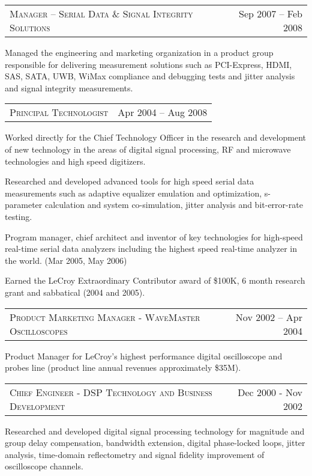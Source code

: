 \documentclass[10pt,letterpaper]{extarticle}
\makeatletter
\newcommand{\headerrow}[2]
{\begin{tabular*}{\linewidth}{l@{\extracolsep{\fill}}r}
	#1 &
	#2 \\
\end{tabular*}}
\makeatother
\begin{document}
	\headerrow
	{\large \textsc{Manager – Serial Data \& Signal Integrity Solutions}}
	{Sep 2007 – Feb 2008}\vspace{-\topsep}\begin{itemize*}
	\item Managed the engineering and marketing organization in a product group responsible 
	for delivering measurement solutions such as PCI-Express, HDMI, SAS, SATA, UWB, WiMax 
	compliance and debugging tests and jitter analysis and signal integrity measurements.
	\end{itemize*}\vspace{-\topsep}
	\headerrow
	{\large \textsc{Principal  Technologist}}
	{Apr 2004 – Aug 2008}\vspace{-\topsep}\begin{itemize*}
	\item Worked directly for the Chief Technology Officer in the research and development
	of new technology in the areas of digital signal processing, RF and microwave
	 technologies and high speed digitizers.
	\item Researched and developed advanced tools for high speed serial data measurements
	 such as adaptive equalizer emulation and optimization, s-parameter calculation and
	 system co-simulation, jitter analysis and bit-error-rate testing.
	\item Program manager, chief architect and inventor of key technologies for high-speed
	real-time serial data analyzers including the highest speed real-time analyzer in the
	world. (Mar 2005,  May 2006)
	\item Earned the LeCroy Extraordinary Contributor award of \$100K, 6 month research grant and sabbatical (2004 and 2005).
	\end{itemize*}\vspace{-\topsep}
	\headerrow
	{\large \textsc{Product Marketing Manager - WaveMaster Oscilloscopes}}
	{Nov 2002 – Apr 2004}\vspace{-\topsep}\begin{itemize*}
	\item Product Manager for LeCroy's highest performance digital oscilloscope and probes
	line (product line annual revenues approximately \$35M).
	\end{itemize*}\vspace{-\topsep}
	\headerrow
	{\large \textsc{Chief Engineer - DSP Technology and Business Development}}
	{Dec 2000 - Nov 2002}\vspace{-\topsep}\begin{itemize*}
	\item Researched and developed digital signal processing technology for magnitude 
	and group delay compensation, bandwidth extension, digital phase-locked loops, jitter 
	analysis, time-domain reflectometry and signal fidelity improvement of oscilloscope 
	channels.
	\end{itemize*}\vspace{-\topsep}
\end{document}
